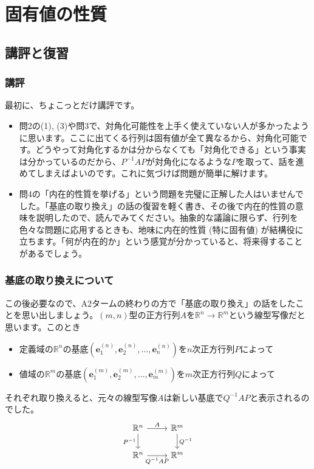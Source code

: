 \chapter{固有値の性質}

\section{講評と復習}

\subsection{講評}

最初に、ちょこっとだけ講評です。
\begin{itemize}
\item 問2の(1), (3)や問3で、対角化可能性を上手く使えていない人が多かったように思います。ここに出てくる行列は固有値が全て異なるから、対角化可能です。どうやって対角化するかは分からなくても「対角化できる」という事実は分かっているのだから、$P^{-1} A P$が対角化になるような$P$を取って、話を進めてしまえばよいのです。これに気づけば問題が簡単に解けます。
\item 問4の「内在的性質を挙げる」という問題を完璧に正解した人はいませんでした。「基底の取り換え」の話の復習を軽く書き、その後で内在的性質の意味を説明したので、読んでみてください。抽象的な議論に限らず、行列を色々な問題に応用するときも、地味に内在的性質 (特に固有値) が結構役に立ちます。「何が内在的か」という感覚が分かっていると、将来得することがあるでしょう。
\end{itemize}

\subsection{基底の取り換えについて}

この後必要なので、A2タームの終わりの方で「基底の取り換え」の話をしたことを思い出しましょう。$(m, n)$型の正方行列$A$を$\mathbb{R}^n \rightarrow \mathbb{R}^m$という線型写像だと思います。このとき
\begin{itemize}
\item 定義域の$\mathbb{R}^n$の基底$(\bm{e}_1^{(n)}, \bm{e}_2^{(n)}, \ldots, \bm{e}_n^{(n)})$を$n$次正方行列$P$によって
\item 値域の$\mathbb{R}^m$の基底$(\bm{e}_1^{(m)}, \bm{e}_2^{(m)}, \ldots, \bm{e}_m^{(m)})$を$m$次正方行列$Q$によって
\end{itemize}
それぞれ取り換えると、元々の線型写像$A$は新しい基底で$Q^{-1} A P$と表示されるのでした。
\[
\begin{tikzcd}
\mathbb{R}^n \arrow{r}{A} \arrow{d}[swap]{P^{-1}} & \mathbb{R}^m \arrow{d}{Q^{-1}} \\
\mathbb{R}^n \arrow{r}[swap]{Q^{-1} A P} & \mathbb{R}^m
\end{tikzcd}
\]

